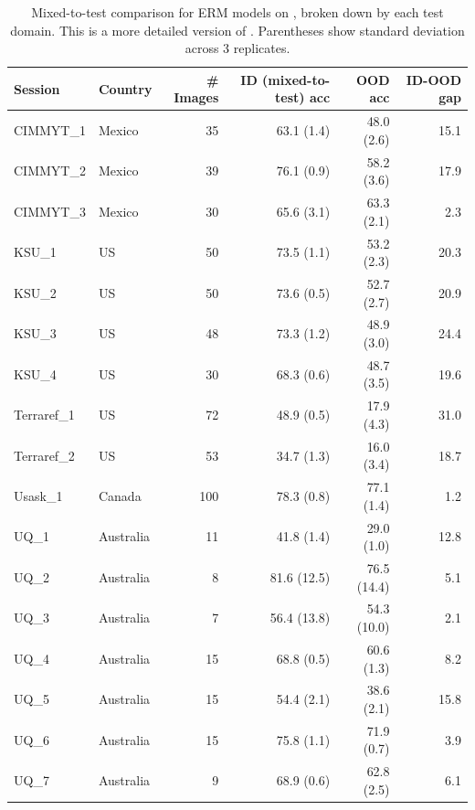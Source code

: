 \begin{table}[!h]
  \caption{Mixed-to-test comparison for ERM models on \Wheat, broken down by each test domain. This is a more detailed version of . Parentheses show standard deviation across 3 replicates.}
\centering
  \begin{tabular}{llrrrr}
    \toprule
      Session    & Country & \# Images &  ID (mixed-to-test) acc     &     OOD acc       &  ID-OOD gap \\
    \midrule
      CIMMYT\_1   & Mexico    & 35   &   63.1 (1.4)  &     48.0 (2.6)    & 15.1 \\
      CIMMYT\_2   & Mexico    & 39   &   76.1 (0.9)  &     58.2 (3.6)    & 17.9 \\
      CIMMYT\_3   & Mexico    & 30   &   65.6 (3.1)  &     63.3 (2.1)    & 2.3 \\
      KSU\_1      & US        & 50  &   73.5 (1.1)  &     53.2 (2.3)    & 20.3 \\
      KSU\_2      & US        & 50  &   73.6 (0.5)  &     52.7 (2.7)    & 20.9 \\
      KSU\_3      & US        & 48   &   73.3 (1.2)  &     48.9 (3.0)    & 24.4 \\
      KSU\_4      & US        & 30   &   68.3 (0.6)  &     48.7 (3.5)    & 19.6 \\
      Terraref\_1 & US        & 72  &   48.9 (0.5)  &     17.9 (4.3)    & 31.0 \\
      Terraref\_2 & US        & 53  &   34.7 (1.3)  &     16.0 (3.4)    & 18.7 \\
      Usask\_1    & Canada    & 100  &   78.3 (0.8)  &     77.1 (1.4)    &  1.2 \\
      UQ\_1       & Australia & 11    &   41.8 (1.4)  &     29.0 (1.0)    & 12.8 \\
      UQ\_2       & Australia & 8     &   81.6 (12.5) &     76.5 (14.4)   & 5.1 \\
      UQ\_3       & Australia & 7    &   56.4 (13.8) &     54.3 (10.0)    & 2.1 \\
      UQ\_4       & Australia & 15   &   68.8 (0.5)  &     60.6 (1.3)    & 8.2 \\
      UQ\_5       & Australia & 15   &   54.4 (2.1)  &     38.6 (2.1)    & 15.8 \\
      UQ\_6       & Australia & 15   &   75.8 (1.1)  &     71.9 (0.7)    &  3.9 \\
      UQ\_7       & Australia & 9   &   68.9 (0.6)  &     62.8 (2.5)    &  6.1 \\

\end{tabular}
\end{table}
